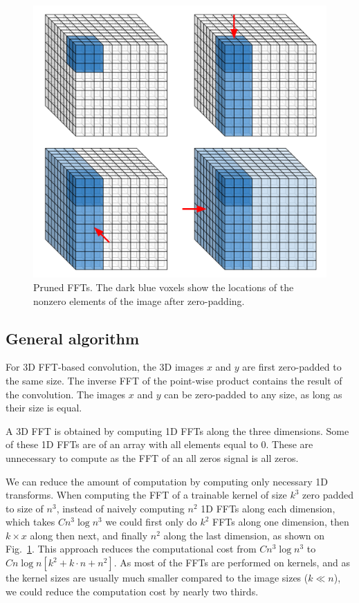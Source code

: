 \documentclass[conference]{./IEEEtran}
\begin{document}
  \begin{figure}
    \begin{center}
      \includegraphics[width=0.49\columnwidth]{pruned_ffts.pdf}
    \end{center}
    \caption{Pruned FFTs. The dark blue voxels show the locations of
      the nonzero elements of the image after zero-padding. }
    \label{fig:pruned_ffts}
  \end{figure}

  \subsection{General algorithm}

  For 3D FFT-based convolution, the 3D images $x$ and $y$ are first
  zero-padded to the same size.  The inverse FFT of the point-wise
  product contains the result of the convolution.  The images $x$ and
  $y$ can be zero-padded to any size, as long as their size is equal.

  A 3D FFT is obtained by computing 1D FFTs along the three
  dimensions.  Some of these 1D FFTs are of an array with all elements
  equal to $0$.  These are unnecessary to compute as the FFT of
  an all zeros signal is all zeros.

  We can reduce the amount of computation by computing only necessary
  1D transforms.  When computing the FFT of a trainable kernel of size
  $k^3$ zero padded to size of $n^3$, instead of naively computing
  $n^2$ 1D FFTs along each dimension, which takes $C n^3 \log n^3$ we
  could first only do $k^2$ FFTs along one dimension, then $k \times
  x$ along then next, and finally $n^2$ along the last dimension, as
  shown on Fig.~\ref{fig:pruned_ffts}.  This approach reduces the
  computational cost from $C n^3 \log n^3$ to $C n\log n[k^2 + k \cdot
    n + n^2]$.  As most of the FFTs are performed on kernels, and as
  the kernel sizes are usually much smaller compared to the image
  sizes ($k \ll n$), we could reduce the computation cost by nearly
  two thirds.
\end{document}
